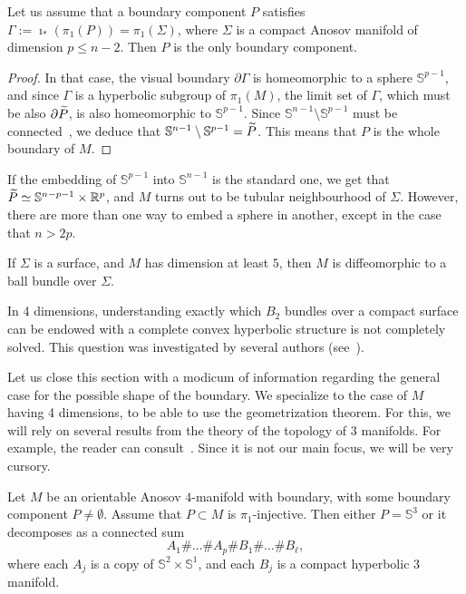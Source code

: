 \documentclass[AHL,Unicode,longabstracts,published]{cedram}
\newcommand{\R}{\mathbb{R}}
\newcommand{\Ss}{\mathbb{S}}
\theoremstyle{plain}
\let\oldtilde\tilde
\renewcommand*{\tilde}[1]{\mathchoice{\widetilde{#1}}{\widetilde{#1}}{\oldtilde{#1}}{\oldtilde{#1}}}
\begin{document}
\begin{lemm}
Let us assume that a boundary component $P$ satisfies $\Gamma:=\imath_\ast(\pi_1(P))= \pi_1(\Sigma)$, where $\Sigma$ is a compact Anosov manifold of dimension $p\leq n-2$. Then $P$ is the only boundary component.
\end{lemm}

\begin{proof}
In that case, the visual boundary $\partial \Gamma$ is homeomorphic to a sphere $\Ss^{p-1}$, and since $\Gamma$ is a hyperbolic subgroup of $\pi_1(M)$, the limit set of $\Gamma$, which must be also $\partial \tilde{P}$, is also homeomorphic to $\Ss^{p-1}$. Since $\Ss^{n-1}\setminus\Ss^{p-1}$ must be connected~\cite[Proposition~2.B.1]{Hatcher}, we deduce that $\Ss^{n-1}\setminus \Ss^{p-1} = \tilde{P}$. This means that $P$ is the whole boundary of $M$.
\end{proof}

If the embedding of $\Ss^{p-1}$ into $\Ss^{n-1}$ is the standard one, we get that $\tilde{P}\simeq \Ss^{n-p-1}\times\R^{p}$, and $M$ turns out to be tubular neighbourhood of $\Sigma$. However, there are more than one way to embed a sphere in another, except in the case that $n> 2p$.

\begin{coro}
If $\Sigma$ is a surface, and $M$ has dimension at least $5$, then $M$ is diffeomorphic to a ball bundle over $\Sigma$.
\end{coro}

In 4 dimensions, understanding exactly which $B_2$ bundles over a compact surface can be endowed with a complete convex hyperbolic structure is not completely solved. This question was investigated by several authors (see~\cite{gromov,convex-plumbing}).


Let us close this section with a modicum of information regarding the general case for the possible shape of the boundary. We specialize to the case of $M$ having 4 dimensions, to be able to use the geometrization theorem. For this, we will rely on several results from the theory of the topology of 3 manifolds. For example, the reader can consult~\cite[Section~3]{Freitas}. Since it is not our main focus, we will be very cursory.

\begin{lemm}
Let $M$ be an orientable Anosov $4$-manifold with boundary, with some boundary component $P\neq \emptyset$. Assume that $P\subset M$ is $\pi_1$-injective. Then either $P=\Ss^3$ or it decomposes as a connected sum
\[
A_1 \#\dots \# A_p \# B_1 \# \dots \# B_\ell,
\]
where each $A_j$ is a copy of $\Ss^2\times \Ss^1$, and each $B_j$ is a compact hyperbolic 3 manifold.
\end{lemm}
\end{document}
